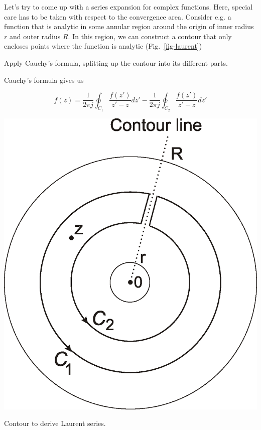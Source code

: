 
Let's try to come up with a series expansion for complex functions. Here, special care has to be taken with respect to the convergence area. Consider e.g. a function that is analytic in some annular region around the origin of inner radius $r$ and outer radius $R$. In this region, we can construct a contour that only encloses points where the function is analytic (Fig.~\ref{fig-laurent})

\begin{cue}
  Apply Cauchy's formula, splitting up the contour into its different parts.
\end{cue}

Cauchy's formula gives us

\begin{equation}
f(z)=\frac{1}{2 \pi j }\oint_{{C}_1} \frac{f(z')} {z'-z} dz' -\frac{1}{2
\pi j }\oint_{{C}_2} \frac{f(z')} {z'-z} dz' \label{laurent_0}
\end{equation} 

\begin{marginfigure}
\includegraphics{complex/figures/laurent}
\caption{Contour to derive Laurent series.}
\label{fig-laurent}
\end{marginfigure}

